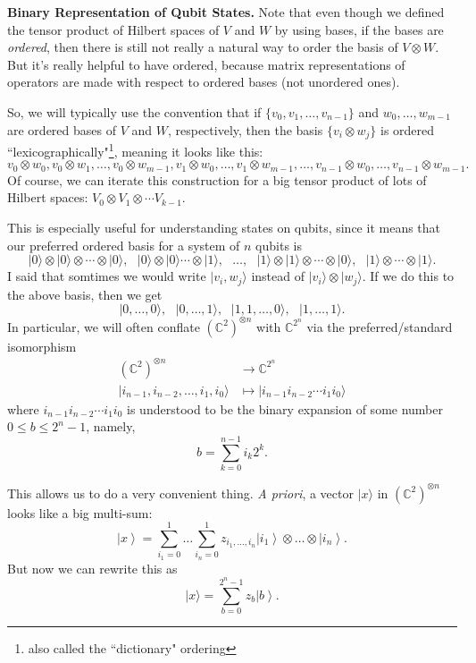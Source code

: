 \documentclass{article}
\newcommand{\ket}[1]{|#1\rangle}
\newcommand{\bbC}{\mathbb{C}}
\begin{document}
\textbf{Binary Representation of Qubit States.}  Note that even though we defined the tensor product of Hilbert spaces of $V$ and $W$ by using bases, if the bases are \emph{ordered}, then there is still not really a natural way to order the basis of $V\otimes W$.  But it's really helpful to have ordered, because matrix representations of operators are made with respect to ordered bases (not unordered ones).

So, we will typically use the convention that if $\{v_0,v_1,\dots,v_{n-1}\}$ and ${w_0,\dots,w_{m-1}}$ are ordered bases of $V$ and $W$, respectively, then the basis $\{v_i \otimes w_j\}$ is ordered ``lexicographically"\footnote{also called the ``dictionary" ordering}, meaning it looks like this:
\[ v_0 \otimes w_0, v_0 \otimes w_1, \dots, v_0 \otimes w_{m-1}, v_1 \otimes w_0, \dots, v_1 \otimes w_{m-1}, \dots, v_{n-1} \otimes w_0, \dots, v_{n-1} \otimes w_{m-1}.\]
Of course, we can iterate this construction for a big tensor product of lots of Hilbert spaces: $V_0 \otimes V_1 \otimes \cdots V_{k-1}$.

This is especially useful for understanding states on qubits, since it means that our preferred ordered basis for a system of $n$ qubits is 
\[ \ket{0} \otimes \ket{0} \otimes \cdots \otimes \ket{0}, \ \ \ \ket{0} \otimes \ket{0} \cdots \otimes \ket{1}, \ \ \  \dots, \ \ \ \ket{1} \otimes \ket{1} \otimes \cdots \otimes \ket{0}, \ \ \ \ket{1} \otimes \cdots \otimes \ket{1} .\]
I said that somtimes we would write $\ket{ v_i, w_j}$ instead of $\ket{v_i} \otimes \ket{w_j}$.  If we do this to the above basis, then we get
\[ \ket{0, \dots, 0}, \ \ \ \ket{0,\dots,1}, \ \ \, \ket{ 1, 1, \dots, 0}, \ \ \ \ket{1, \dots, 1}.\]
In particular, we will often conflate $(\mathbb{C}^2)^{\otimes n}$ with $\mathbb{C}^{2^n}$ via the preferred/standard isomorphism
\[\begin{aligned}
(\mathbb{C}^2)^{\otimes n} &\to \mathbb{C}^{2^n} \\
\ket{i_{n-1}, i_{n-2}, \dots, i_1, i_0} &\mapsto \ket{i_{n-1}i_{n-2}\cdots i_1i_0}
\end{aligned}\]
where $i_{n-1}i_{n-2}\cdots i_1i_0$ is understood to be the binary expansion of some number $0 \le b \le 2^n-1$, namely,
\[ b = \sum_{k=0}^{n-1} i_k 2^k. \]

This allows us to do a very convenient thing.  \emph{A priori}, a vector $\ket{x}$ in $(\bbC^2)^{\otimes n}$ looks like a big multi-sum:
\[
\left| x \right\rangle  = \sum_{i_1 = 0}^1 \ldots \sum_{i _n = 0}^1 z_{i_1, \ldots, i_n} \left| i_1 \right\rangle  \otimes  \ldots \otimes  \left| i_n \right\rangle.\]
But now we can rewrite this as
\[ \ket{x} = \sum_{b=0}^{2^n-1} z_b \left| b \right\rangle 
.\] 
\end{document}
